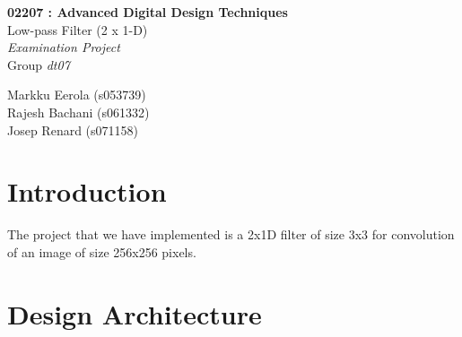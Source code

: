 \documentclass[11pt,a4paper]{article}
\begin{document}
	

\begin{titlepage}

\thispagestyle{fancy}
\lhead{}
\rhead{}
\rule{0pt}{50pt}
\vspace{3cm}

\begin{center}
 	\huge{\textbf{02207 : Advanced Digital Design Techniques}}\\
 	\vspace{1cm}
 	\huge{Low-pass Filter (2 x 1-D)}\\
 	\vspace{1cm}
 	\huge{\textit{Examination Project}}\\
 	\vspace{1cm}
 	\huge{Group \textit{dt07}}\\
\end{center}

\vspace{4cm}

\begin{flushright}
	\LARGE{Markku Eerola (s053739)}\\
	\vspace{0.3cm}
	\LARGE{Rajesh Bachani (s061332)}\\
	\vspace{0.3cm}
	\LARGE{Josep Renard (s071158)}\\
\end{flushright}
\cfoot{\today}
\end{titlepage}

\newpage 
\tableofcontents

\newpage

\section{Introduction}
The project that we have implemented is a 2x1D filter of size 3x3 for convolution of an image of size 256x256 pixels.  

\section{Design Architecture}
\end{document}
